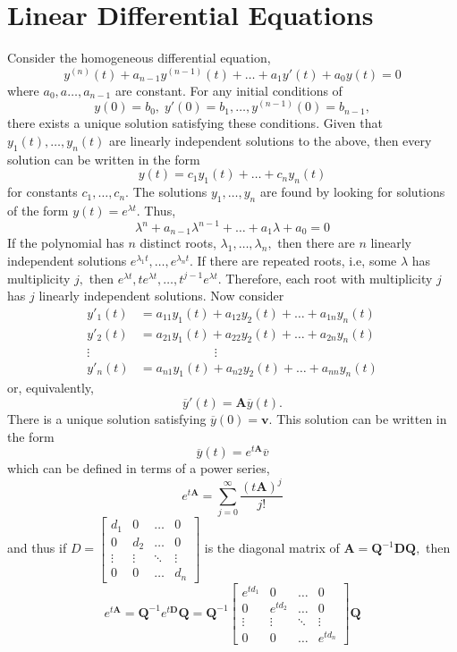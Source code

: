 \documentclass[oneside]{book}
\begin{document}
\section{Linear Differential Equations}
Consider the homogeneous differential equation,
\[y^{(n)}(t) + a_{n-1}y^{(n-1)}(t) + \dots + a_1y'(t) + a_0y(t) = 0\] where $a_0, a\dots, a_{n-1}$ are constant. For any initial conditions of \[y(0) = b_0, \; y'(0) = b_1, \dots, y^{(n-1)}(0) = b_{n-1},\] there exists a unique solution satisfying these conditions. Given that $y_1(t), \dots, y_n(t)$ are linearly independent solutions to the above, then every solution can be written in the form \[y(t) = c_1y_1(t) + \dots + c_ny_n(t)\] for constants $c_1, \dots, c_n.$
The solutions $y_1, \dots, y_n$ are found by looking for solutions of the form $y(t) = e^{\lambda t}.$ Thus,
\[\lambda^n + a_{n-1}\lambda^{n-1} + \dots + a_1\lambda + a_0 = 0\]
If the polynomial has $n$ distinct roots, $\lambda_1, \dots, \lambda_n,$ then there are $n$ linearly independent solutions $e^{\lambda_1t}, \dots, e^{\lambda_nt}.$ If there are repeated roots, i.e, some $\lambda$ has multiplicity $j,$ then $e^{\lambda t}, te^{\lambda t}, \dots, t^{j-1}e^{\lambda t}.$ Therefore, each root with multiplicity $j$ has $j$ linearly independent solutions. Now consider
\begin{align*}
y'_1(t) &= a_{11}y_1(t) + a_{12}y_2(t) + \dots + a_{1n}y_n(t)    \\
y'_2(t) &= a_{21}y_1(t) + a_{22}y_2(t) + \dots + a_{2n}y_n(t)    \\
\vdots &\qquad \qquad \qquad \vdots\\
y'_n(t) &= a_{n1}y_1(t) + a_{n2}y_2(t) + \dots + a_{nn}y_n(t)
\end{align*}
or, equivalently, \[\overline{y}'(t) = \textbf{A}\overline{y}(t).\]
There is a unique solution satisfying $\overline{y}(0) = \textbf{v}.$ This solution can be written in the form
\[\overline{y}(t) = e^{t\textbf{A}}\overline{v}\] which can be defined in terms of a power series, \[e^{t\textbf{A}} = \sum_{j = 0}^\infty \frac{(t\textbf{A})^j}{j!}\] and thus if $D = \begin{bmatrix}
    d_1 & 0 & \dots & 0\\
    0 & d_2 & \dots & 0\\
    \vdots & \vdots & \ddots & \vdots \\
    0 & 0 & \dots & d_n
\end{bmatrix}$ is the diagonal matrix of $\textbf{A} = \textbf{Q}^{-1}\textbf{D}\textbf{Q},$ then \[e^{t\textbf{A}} = \textbf{Q}^{-1}e^{t\textbf{D}}\textbf{Q} = \textbf{Q}^{-1}\begin{bmatrix}
    e^{td_1} & 0 & \dots & 0\\
    0 & e^{td_2} & \dots & 0\\
    \vdots & \vdots & \ddots & \vdots \\
    0 & 0 & \dots & e^{td_n}
\end{bmatrix}\textbf{Q}\]
\end{document}
